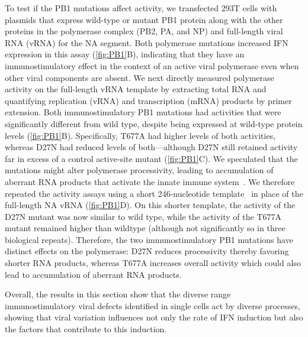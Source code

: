 \documentclass[lineno]{asm-article}
\newcommand{\FIG}[1]{\autoref{fig:#1}}
\begin{document}
To test if the PB1 mutations affect activity, we transfected 293T cells with plasmids that express wild-type or mutant PB1 protein along with the other proteins in the polymerase complex (PB2, PA, and NP) and full-length viral RNA (vRNA) for the NA segment.
Both polymerase mutations increased IFN expression in this assay (\FIG{PB1}B), indicating that they have an immunostimulatory effect in the context of an active viral polymerase even when other viral components are absent.
We next directly measured polymerase activity on the full-length vRNA template by extracting total RNA and quantifying replication (vRNA) and transcription (mRNA) products by primer extension.
Both immunostimulatory PB1 mutations had activities that were significantly different from wild type, despite being expressed at wild-type protein levels (\FIG{PB1}B).
Specifically, T677A had higher levels of both activities, whereas D27N had reduced levels of both---although D27N still retained activity far in excess of a control active-site mutant (\FIG{PB1}C).
We speculated that the mutations might alter polymerase processivity, leading to accumulation of aberrant RNA products that activate the innate immune system~\cite{velthuis2018mini, baum2010preference, tapia2013defective, boergeling2015evidence, dimmock2015cloned, liu2019inhibition}.
We therefore repeated the activity assays using a short 246-nucleotide template~\cite{velthuis2018mini} in place of the full-length NA vRNA (\FIG{PB1}D).
On this shorter template, the activity of the D27N mutant was now similar to wild type, while the activity of the T677A mutant remained higher than wildtype (although not significantly so in three biological repeats). 
Therefore, the two immunostimulatory PB1 mutations have distinct effects on the polymerase: D27N reduces processivity thereby favoring shorter RNA products, whereas T677A increases overall activity which could also lead to accumulation of aberrant RNA products.

Overall, the results in this section show that the diverse range immunostimulatory viral defects identified in single cells act by diverse processes, showing that viral variation influences not only the rate of IFN induction but also the factors that contribute to this induction.
\end{document}
